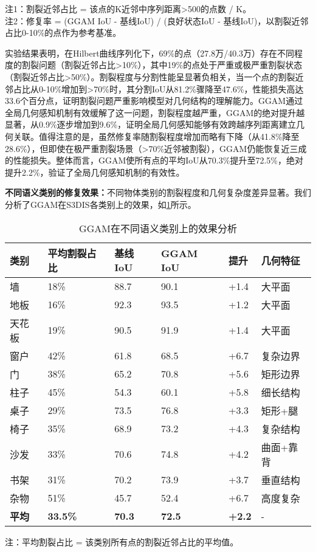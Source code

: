 \documentclass[preprint,12pt]{elsarticle}
\begin{document}
注1：割裂近邻占比 = 该点的K近邻中序列距离>500的点数 / K。\\
注2：修复率 = (GGAM IoU - 基线IoU) / (良好状态IoU - 基线IoU)，以割裂近邻占比0-10\%的点作为参考基准。

实验结果表明，在Hilbert曲线序列化下，69\%的点（27.8万/40.3万）存在不同程度的割裂问题（割裂近邻占比>10\%），其中19\%的点处于严重或极严重割裂状态（割裂近邻占比>50\%）。割裂程度与分割性能呈显著负相关，当一个点的割裂近邻占比从0-10\%增加到>70\%时，其分割IoU从81.2\%骤降至47.6\%，性能损失高达33.6个百分点，证明割裂问题严重影响模型对几何结构的理解能力。GGAM通过全局几何感知机制有效缓解了这一问题，割裂程度越严重，GGAM的绝对提升越显著，从0.9\%逐步增加到9.6\%，证明全局几何感知能够有效跨越序列距离建立几何关联。值得注意的是，虽然修复率随割裂程度增加而略有下降（从41.8\%降至28.6\%），但即使在极严重割裂场景（>70\%近邻被割裂），GGAM仍能恢复近三成的性能损失。整体而言，GGAM使所有点的平均IoU从70.3\%提升至72.5\%，绝对提升2.2\%，验证了全局几何感知机制的有效性。



\textbf{不同语义类别的修复效果：}不同物体类别的割裂程度和几何复杂度差异显著。我们分析了GGAM在S3DIS各类别上的效果，如\cref{tab:ggam_per_class}所示。

\begin{table}[htbp!]
	\centering
	\caption{GGAM在不同语义类别上的效果分析}
	\label{tab:ggam_per_class}
	\begin{tabular}{@{}llllll@{}}
		\toprule
		类别 & 平均割裂占比 & 基线IoU & GGAM IoU & 提升 & 几何特征 \\ 
		\midrule
		墙 & 18\% & 88.7 & 90.1 & +1.4 & 大平面 \\
		地板 & 16\% & 92.3 & 93.5 & +1.2 & 大平面 \\
		天花板 & 19\% & 90.5 & 91.9 & +1.4 & 大平面 \\
		\midrule
		窗户 & 42\% & 61.8 & 68.5 & +6.7 & 复杂边界 \\
		门 & 38\% & 65.2 & 70.8 & +5.6 & 矩形边界 \\
		柱子 & 45\% & 54.3 & 60.1 & +5.8 & 细长结构 \\
		\midrule
		桌子 & 29\% & 73.5 & 76.8 & +3.3 & 矩形+腿 \\
		椅子 & 35\% & 68.9 & 73.2 & +4.3 & 复杂结构 \\
		沙发 & 33\% & 70.6 & 74.8 & +4.2 & 曲面+靠背 \\
		书架 & 31\% & 70.2 & 73.9 & +3.7 & 垂直结构 \\
		杂物 & 51\% & 45.7 & 52.4 & +6.7 & 高度复杂 \\
		\midrule
		\textbf{平均} & \textbf{33.5\%} & \textbf{70.3} & \textbf{72.5} & \textbf{+2.2} & - \\
		\bottomrule
	\end{tabular}
\end{table}
注：平均割裂占比 = 该类别所有点的割裂近邻占比的平均值。
\end{document}
